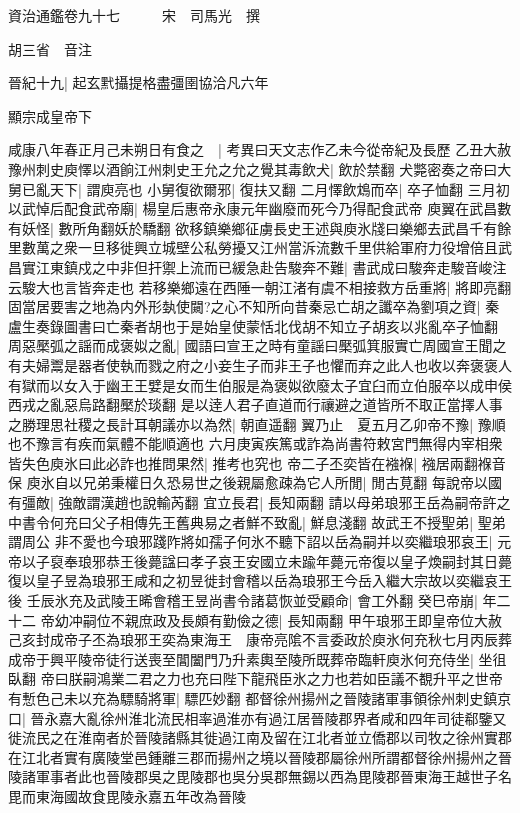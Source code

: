 資治通鑑卷九十七　　　宋　司馬光　撰

胡三省　音注

晉紀十九|{
	起玄黓攝提格盡彊圉協洽凡六年}


顯宗成皇帝下

咸康八年春正月己未朔日有食之　|{
	考異曰天文志作乙未今從帝紀及長歷}
乙丑大赦　豫州刺史庾懌以酒餉江州刺史王允之允之覺其毒飲犬|{
	飲於禁翻}
犬斃密奏之帝曰大舅已亂天下|{
	謂庾亮也}
小舅復欲爾邪|{
	復扶又翻}
二月懌飲鴆而卒|{
	卒子恤翻}
三月初以武悼后配食武帝廟|{
	楊皇后惠帝永康元年幽廢而死今乃得配食武帝}
庾翼在武昌數有妖怪|{
	數所角翻妖於驕翻}
欲移鎮樂鄉征虜長史王述與庾氷牋曰樂鄉去武昌千有餘里數萬之衆一旦移徙興立城壁公私勞擾又江州當泝流數千里供給軍府力役增倍且武昌實江東鎮戍之中非但扞禦上流而已緩急赴告駿奔不難|{
	書武成曰駿奔走駿音峻注云駿大也言皆奔走也}
若移樂鄉遠在西陲一朝江渚有虞不相接救方岳重將|{
	將即亮翻}
固當居要害之地為内外形埶使闚?之心不知所向昔秦忌亡胡之讖卒為劉項之資|{
	秦盧生奏錄圖書曰亡秦者胡也于是始皇使蒙恬北伐胡不知立子胡亥以兆亂卒子恤翻}
周惡檿弧之謡而成褒姒之亂|{
	國語曰宣王之時有童謡曰檿弧箕服實亡周國宣王聞之有夫婦鬻是器者使執而戮之府之小妾生子而非王子也懼而弃之此人也收以奔褒褒人有獄而以女入于幽王王嬖是女而生伯服是為褒姒欲廢太子宜臼而立伯服卒以成申侯西戎之亂惡烏路翻檿於琰翻}
是以逹人君子直道而行禳避之道皆所不取正當擇人事之勝理思社稷之長計耳朝議亦以為然|{
	朝直遥翻}
翼乃止　夏五月乙卯帝不豫|{
	豫順也不豫言有疾而氣體不能順適也}
六月庚寅疾篤或詐為尚書符敕宮門無得内宰相衆皆失色庾氷曰此必詐也推問果然|{
	推考也究也}
帝二子丕奕皆在襁褓|{
	襁居兩翻褓音保}
庾氷自以兄弟秉權日久恐易世之後親屬愈疎為它人所閒|{
	閒古莧翻}
每說帝以國有彊敵|{
	強敵謂漢趙也說輸芮翻}
宜立長君|{
	長知兩翻}
請以母弟琅邪王岳為嗣帝許之中書令何充曰父子相傳先王舊典易之者鮮不致亂|{
	鮮息淺翻}
故武王不授聖弟|{
	聖弟謂周公}
非不愛也今琅邪踐阼將如孺子何氷不聽下詔以岳為嗣并以奕繼琅邪哀王|{
	元帝以子裒奉琅邪恭王後薨諡曰孝子哀王安國立未踰年薨元帝復以皇子煥嗣封其日薨復以皇子昱為琅邪王咸和之初昱徙封會稽以岳為琅邪王今岳入繼大宗故以奕繼哀王後}
壬辰氷充及武陵王晞會稽王昱尚書令諸葛恢並受顧命|{
	會工外翻}
癸巳帝崩|{
	年二十二}
帝幼冲嗣位不親庶政及長頗有勤儉之德|{
	長知兩翻}
甲午琅邪王即皇帝位大赦己亥封成帝子丕為琅邪王奕為東海王　康帝亮隂不言委政於庾氷何充秋七月丙辰葬成帝于興平陵帝徒行送喪至閶闔門乃升素輿至陵所既葬帝臨軒庾氷何充侍坐|{
	坐徂臥翻}
帝曰朕嗣鴻業二君之力也充曰陛下龍飛臣氷之力也若如臣議不覩升平之世帝有慙色己未以充為驃騎將軍|{
	驃匹妙翻}
都督徐州揚州之晉陵諸軍事領徐州刺史鎮京口|{
	晉永嘉大亂徐州淮北流民相率過淮亦有過江居晉陵郡界者咸和四年司徒郗鑒又徙流民之在淮南者於晉陵諸縣其徙過江南及留在江北者並立僑郡以司牧之徐州實郡在江北者實有廣陵堂邑鍾離三郡而揚州之境以晉陵郡屬徐州所謂都督徐州揚州之晉陵諸軍事者此也晉陵郡吳之毘陵郡也吳分吳郡無錫以西為毘陵郡晉東海王越世子名毘而東海國故食毘陵永嘉五年改為晉陵}

